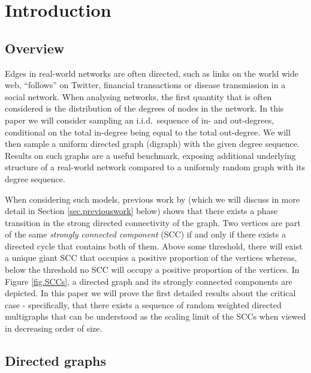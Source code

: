 \section{Introduction}


\subsection{Overview}

Edges in real-world networks are often directed, such as links on the world wide web, ``follows'' on Twitter, financial transactions or disease transmission in a social network. When analysing networks, the first quantity that is often considered is the distribution of the degrees of nodes in the network.  In this paper we will consider sampling an i.i.d.\ sequence of in- and out-degrees, conditional on the total in-degree being equal to the total out-degree. We will then sample a uniform directed graph (digraph) with the given degree sequence. Results on such graphs are a useful benchmark, exposing additional underlying structure of a real-world network compared to a uniformly random graph with its degree sequence.

When considering such models, previous work by \citet{cooperSizeLargestStrongly2004} (which we will discuss in more detail in Section \ref{sec.previouswork} below) shows that there exists a phase transition in the strong directed connectivity of the graph. Two vertices are part of the same \emph{strongly connected component} (SCC) if and only if there exists a directed cycle that contains both of them. Above some threshold, there will exist a unique giant SCC that occupies a positive proportion of the vertices whereas, below the threshold no SCC will occupy a positive proportion of the vertices. In Figure \ref{fig.SCCs}, a directed graph and its strongly connected components are depicted. In this paper we will prove the first detailed results about the critical case - specifically, that there exists a sequence of random weighted directed multigraphs that can be understood as the scaling limit of the SCCs when viewed in decreasing order of size.

\subsection{Directed graphs}

